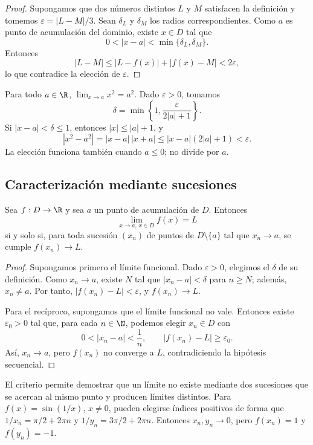 \begin{proof}
Supongamos que dos números distintos \(L\) y \(M\) satisfacen la definición y
tomemos \(\varepsilon=|L-M|/3\). Sean \(\delta_L\) y \(\delta_M\) los radios
correspondientes. Como \(a\) es punto de acumulación del dominio, existe
\(x\in D\) tal que
\[
  0<|x-a|<\min\{\delta_L,\delta_M\}.
\]
Entonces
\[
  |L-M|\le |L-f(x)|+|f(x)-M|<2\varepsilon,
\]
lo que contradice la elección de \(\varepsilon\).
\end{proof}

\begin{ejemplo}
Para todo \(a\in\R\),
\(\lim_{x\to a}x^2=a^2\). Dado \(\varepsilon>0\), tomamos
\[
  \delta=\min\left\{1,\frac{\varepsilon}{2|a|+1}\right\}.
\]
Si \(|x-a|<\delta\le1\), entonces \(|x|\le|a|+1\), y
\[
 |x^2-a^2|=|x-a|\,|x+a|
 \le |x-a|(2|a|+1)<\varepsilon.
\]
La elección funciona también cuando \(a\le0\); no divide por \(a\).
\end{ejemplo}

\subsection{Caracterización mediante sucesiones}

\begin{teorema}
Sea \(f:D\to\R\) y sea \(a\) un punto de acumulación de \(D\). Entonces
\[
 \lim_{x\to a,\,x\in D}f(x)=L
\]
si y solo si, para toda sucesión \((x_n)\) de puntos de
\(D\setminus\{a\}\) tal que \(x_n\to a\), se cumple \(f(x_n)\to L\).
\end{teorema}

\begin{proof}
Supongamos primero el límite funcional. Dado \(\varepsilon>0\), elegimos el
\(\delta\) de su definición. Como \(x_n\to a\), existe \(N\) tal que
\(|x_n-a|<\delta\) para \(n\ge N\); además, \(x_n\ne a\). Por tanto,
\(|f(x_n)-L|<\varepsilon\), y \(f(x_n)\to L\).

Para el recíproco, supongamos que el límite funcional no vale. Entonces existe
\(\varepsilon_0>0\) tal que, para cada \(n\in\N\), podemos elegir
\(x_n\in D\) con
\[
  0<|x_n-a|<\frac1n,
  \qquad
  |f(x_n)-L|\ge\varepsilon_0.
\]
Así, \(x_n\to a\), pero \(f(x_n)\) no converge a \(L\), contradiciendo la
hipótesis secuencial.
\end{proof}

El criterio permite demostrar que un límite no existe mediante dos sucesiones
que se acercan al mismo punto y producen límites distintos. Para
\(f(x)=\sin(1/x)\), \(x\ne0\), pueden elegirse índices positivos de forma que
\(1/x_n=\pi/2+2\pi n\) y \(1/y_n=3\pi/2+2\pi n\). Entonces
\(x_n,y_n\to0\), pero \(f(x_n)=1\) y \(f(y_n)=-1\).

